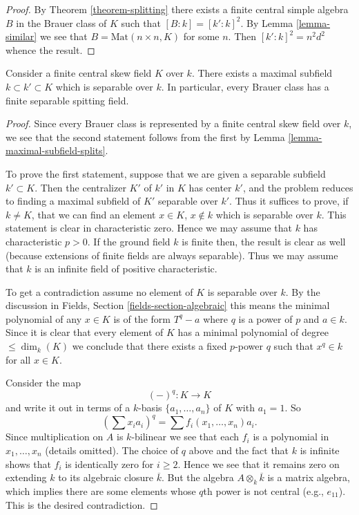 \begin{proof}
By Theorem \ref{theorem-splitting} there exists a finite central
simple algebra $B$ in the Brauer class of $K$ such that
$[B : k] = [k' : k]^2$. By
Lemma \ref{lemma-similar}
we see that $B = \text{Mat}(n \times n, K)$ for some $n$.
Then $[k' : k]^2 = n^2d^2$ whence the result.
\end{proof}

\begin{proposition}
\label{proposition-separable-splitting-field}
Consider a finite central skew field $K$ over $k$.
There exists a maximal subfield $k \subset k' \subset K$ which
is separable over $k$.
In particular, every Brauer class has a finite separable
spitting field.
\end{proposition}

\begin{proof}
Since every Brauer class is represented by a finite central skew
field over $k$, we see that the second statement follows from the
first by
Lemma \ref{lemma-maximal-subfield-splits}.

\medskip\noindent
To prove the first statement, suppose that we are given a separable
subfield $k' \subset K$. Then the centralizer $K'$ of $k'$ in $K$
has center $k'$, and the problem reduces to finding a maximal
subfield of $K'$ separable over $k'$. Thus it suffices to prove, if
$k \not = K$, that we can find an element $x \in K$, $x \not \in k$
which is separable over $k$. This statement is clear in characteristic
zero. Hence we may assume that $k$ has characteristic $p > 0$. If the
ground field $k$ is finite then, the result is clear as well (because
extensions of finite fields are always separable). Thus we may assume
that $k$ is an infinite field of positive characteristic.

\medskip\noindent
To get a contradiction assume no element of $K$ is separable over $k$.
By the discussion in
Fields, Section \ref{fields-section-algebraic}
this means the minimal polynomial of any $x \in K$ is of the form
$T^q - a$ where $q$ is a power of $p$ and $a \in k$. Since it is
clear that every element of $K$ has a minimal polynomial of degree
$\leq \dim_k(K)$ we conclude that there exists a fixed $p$-power
$q$ such that $x^q \in k$ for all $x \in K$.

\medskip\noindent
Consider the map
$$
(-)^q : K \longrightarrow K
$$
and write it out in terms of a $k$-basis $\{a_1, \ldots, a_n\}$ of $K$
with $a_1 = 1$. So
$$
(\sum x_i a_i)^q = \sum f_i(x_1, \ldots, x_n)a_i.
$$
Since multiplication on $A$ is $k$-bilinear we see that each $f_i$
is a polynomial in $x_1, \ldots, x_n$ (details omitted).
The choice of $q$ above and the fact that $k$ is infinite shows that
$f_i$ is identically zero for $i \geq 2$. Hence we see that it remains
zero on extending $k$ to its algebraic closure $\overline{k}$. But the
algebra $A \otimes_k \overline{k}$ is a matrix algebra, which implies
there are some elements whose $q$th power is not central (e.g., $e_{11}$).
This is the desired contradiction.
\end{proof}


